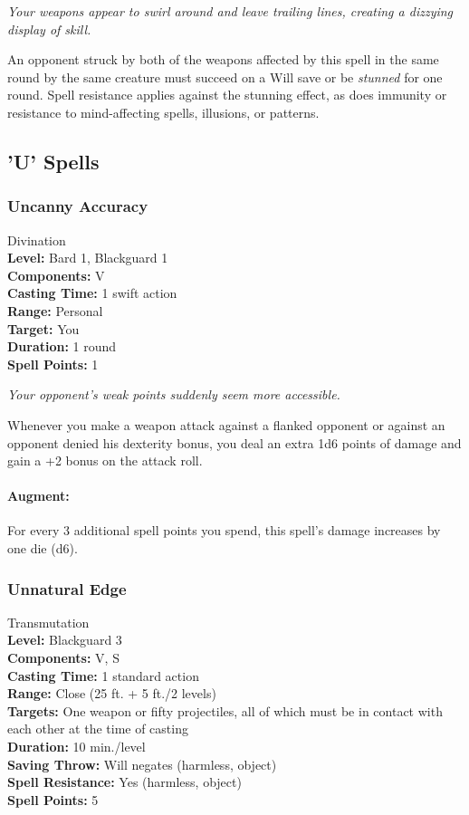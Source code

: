 \emph{Your weapons appear to swirl around and leave trailing lines, creating a dizzying display of skill.}

An opponent struck by both of the weapons affected by this spell in the same round by the same creature must succeed on a Will save or be \emph{stunned} for one round.
Spell resistance applies against the stunning effect, as does immunity or resistance to mind-affecting spells, illusions, or patterns.
\subsection{'U' Spells}
\subsubsection{Uncanny Accuracy}
\label{Spell:UncannyAccuracy}
Divination
\\ \textbf{Level:} Bard 1, Blackguard 1
\\ \textbf{Components:} V
\\ \textbf{Casting Time:} 1 swift action
\\ \textbf{Range:} Personal
\\ \textbf{Target:} You
\\ \textbf{Duration:} 1 round
\\ \textbf{Spell Points:} 1

\emph{Your opponent's weak points suddenly seem more accessible.}

Whenever you make a weapon attack against a flanked opponent or against an opponent denied his dexterity bonus, you deal an extra 1d6 points of damage and gain a +2  bonus on the attack roll.

\paragraph{Augment:} For every 3 additional spell points you spend, this spell's damage increases by one die (d6).
\subsubsection{Unnatural Edge}
\label{Spell:UnnaturalEdge}
Transmutation
\\ \textbf{Level:} Blackguard 3
\\ \textbf{Components:} V, S
\\ \textbf{Casting Time:} 1 standard action
\\ \textbf{Range:} Close (25 ft. + 5 ft./2 levels)
\\ \textbf{Targets:} One weapon or fifty projectiles, all of which must be in contact with each other at the time of casting
\\ \textbf{Duration:} 10 min./level
\\ \textbf{Saving Throw:} Will negates (harmless, object)
\\ \textbf{Spell Resistance:} Yes (harmless, object)
\\ \textbf{Spell Points:} 5

